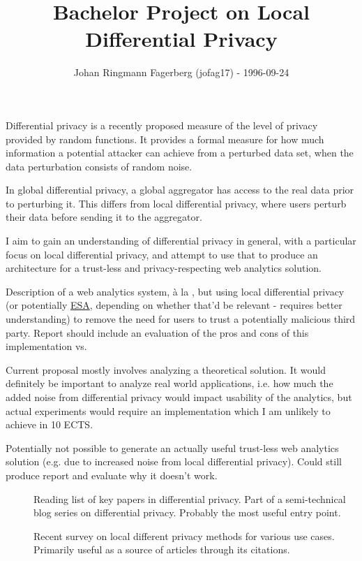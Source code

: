 \documentclass[a4paper]{article}
\title{\vspace{-2cm}Bachelor Project on Local Differential Privacy}
\author{Johan Ringmann Fagerberg (jofag17) - 1996-09-24}
\date{}
\begin{document}
\maketitle

\begin{description}[style=nextline]
    \item[Motivation] Differential privacy is a recently proposed measure of the level of privacy provided by random functions. It provides a formal measure for how much information a potential attacker can achieve from a perturbed data set, when the data perturbation consists of random noise.
    
    In global differential privacy, a global aggregator has access to the real data prior to perturbing it. This differs from local differential privacy, where users perturb their data before sending it to the aggregator.
    
    I aim to gain an understanding of differential privacy in general, with a particular focus on local differential privacy, and attempt to use that to produce an architecture for a trust-less and privacy-respecting web analytics solution.
    
    \item[Product] Description of a web analytics system, à la \cite{webanalytics_2012}, but using local differential privacy (or potentially \href{https://desfontain.es/privacy/local-global-differential-privacy.html#the-best-of-both-worlds}{ESA}, depending on whether that'd be relevant - requires better understanding) to remove the need for users to trust a potentially malicious third party. Report should include an evaluation of the pros and cons of this implementation vs. 
    
    \item[Experiments] Current proposal mostly involves analyzing a theoretical solution. It would definitely be important to analyze real world applications, i.e. how much the added noise from differential privacy would impact usability of the analytics, but actual experiments would require an implementation which I am unlikely to achieve in 10 ECTS.
    
    \item[Risks] Potentially not possible to generate an actually useful trust-less web analytics solution (e.g. due to increased noise from local differential privacy). Could still produce report and evaluate why it doesn't work.
    
    \item[Research entry points] \hfill
    \vspace{-1em}
    \begin{description}
        \item[\cite{desfontain_overview}] Reading list of key papers in differential privacy. Part of a semi-technical blog series on differential privacy. Probably the most useful entry point.
        \item[\cite{localdiffpriv_survey}] Recent survey on local different privacy methods for various use cases. Primarily useful as a source of articles through its citations.
    \end{description}
\end{description}

\printbibliography
\end{document}
